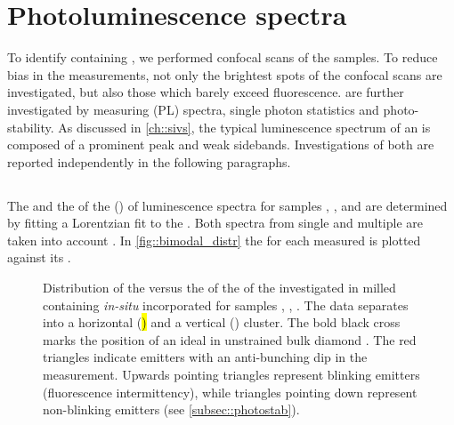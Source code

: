 
\section{Photoluminescence spectra} \label{sec::spectra}

	To identify \nds containing \sivs, we performed confocal scans of the samples.
	To reduce bias in the measurements, not only the brightest spots of the confocal scans are investigated, but also those which barely exceed \bkg fluorescence.
	\sivs are further investigated by measuring \pl (PL) spectra, single photon statistics and photo-stability.
	As discussed in \autoref{ch::sivs}, the typical luminescence spectrum of an \siv is composed of a prominent \zpl peak and weak sidebands.
	Investigations of both are reported independently in the following paragraphs.

\subsection{\Zpl}\label{subsec::zpl}

	The \cwl and the \lw of the \zpl (\ZPL) of \siv luminescence spectra for samples \insituF, \insituS, and \insituH are determined by fitting a Lorentzian fit to the \ZPL.
	Both spectra from single and multiple \sivs are taken into account .
	In \autoref{fig::bimodal_distr} the \lw for each measured \ZPL is plotted against its \cwl.

	\begin{figure}[htp]
			\centering
			\caption[Spectral distribution of \siv \ZPLs]{Distribution of the \ZPL \cwl versus the \lw of the \ZPL of the investigated \sivs in milled \nds containing \textit{in-situ} incorporated \sivs for samples \insituF, \insituS, \insituH{}. The data separates into a horizontal (\hl) and a vertical (\vl) cluster. The bold black cross marks the position of an ideal \siv in unstrained bulk diamond \cite{Arend2016a}. The red triangles indicate emitters with an anti-bunching dip in the \gtz measurement. Upwards pointing triangles represent blinking emitters (fluorescence intermittency), while triangles pointing down represent non-blinking emitters (see \autoref{subsec::photostab}).}
			\label{fig::bimodal_distr}
	\end{figure}

